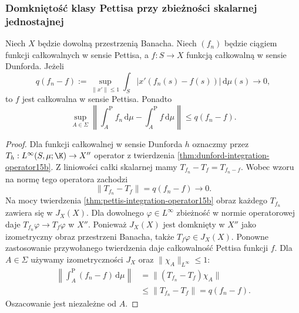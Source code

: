 \subsubsection{Domkniętość klasy Pettisa przy zbieżności skalarnej jednostajnej}

\begin{twierdzenie}
\label{thm:pettis-q-closed15b}
Niech $X$ będzie dowolną przestrzenią Banacha.
Niech $(f_n)$ będzie ciągiem funkcji całkowalnych w sensie
Pettisa, a $f:S\to X$ funkcją całkowalną w sensie Dunforda.
Jeżeli
\[
 q(f_n-f):=
 \sup_{\|x'\|\le1}\int_S|x'(f_n(s)-f(s))|\,\mathrm d\mu(s)
 \longrightarrow0,
\]
to $f$ jest całkowalna w sensie Pettisa. Ponadto
\[
 \sup_{A\in\Sigma}\left\|
 \int_A^{\mathrm P} f_n\,\mathrm d\mu-
 \int_A^{\mathrm P} f\,\mathrm d\mu
 \right\|\le q(f_n-f).
\]
\end{twierdzenie}
\begin{proof}
Dla funkcji całkowalnej w sensie Dunforda $h$
oznaczmy przez $T_h:L^\infty(S,\mu;\K)\to X''$
operator z twierdzenia \ref{thm:dunford-integration-operator15b}.
Z liniowości całki skalarnej mamy
$T_{f_n}-T_f=T_{f_n-f}$. Wobec wzoru na normę tego
operatora zachodzi
\[
 \|T_{f_n}-T_f\|=q(f_n-f)\longrightarrow0.
\]
Na mocy twierdzenia \ref{thm:pettis-integration-operator15b}
obraz każdego $T_{f_n}$ zawiera się w $J_X(X)$.
Dla dowolnego $\varphi\in L^\infty$ zbieżność w normie
operatorowej daje $T_{f_n}\varphi\to T_f\varphi$ w $X''$.
Ponieważ $J_X(X)$ jest domknięty w $X''$ jako izometryczny
obraz przestrzeni Banacha, także $T_f\varphi\in J_X(X)$.
Ponowne zastosowanie przywołanego twierdzenia daje
całkowalność Pettisa funkcji $f$.
Dla $A\in\Sigma$ używamy izometryczności $J_X$
oraz $\|\chi_A\|_{L^\infty}\le1$:
\[
 \begin{aligned}
 \left\|\int_A^{\mathrm P}(f_n-f)\,\mathrm d\mu\right\|
 &=\|(T_{f_n}-T_f)\chi_A\|\\
 &\le\|T_{f_n}-T_f\|=q(f_n-f).
 \end{aligned}
\]
Oszacowanie jest niezależne od $A$.
\end{proof}

